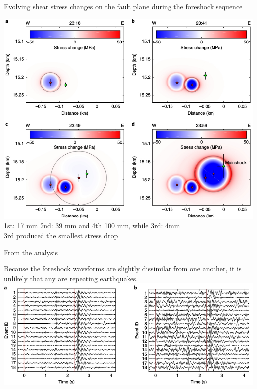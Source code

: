 \documentclass[aspectratio=43,9pt]{beamer}
\begin{document}
\begin{frame}{Evolving shear stress changes on the fault plane during the foreshock sequence}
 \vskip -0.2cm
 
  \begin{center}
   \includegraphics[height=0.6\linewidth]{Figs/fig_3ells.jpg} \\
   1st: 17 mm 2nd: 39 mm and 4th 100 mm, while 3rd: 4mm \\
   3rd produced the smallest stress drop
 \end{center}
 
\end{frame}

\begin{frame}{From the analysis}
 
 Because the foreshock waveforms are slightly dissimilar 
 from one another, it is unlikely that any are repeating 
 earthquakes. \\
 \vskip 0.5cm
 \centering \includegraphics[width=1\linewidth]{Figs/fig_3ells2.jpg} \\
 
\end{frame}
\end{document}
